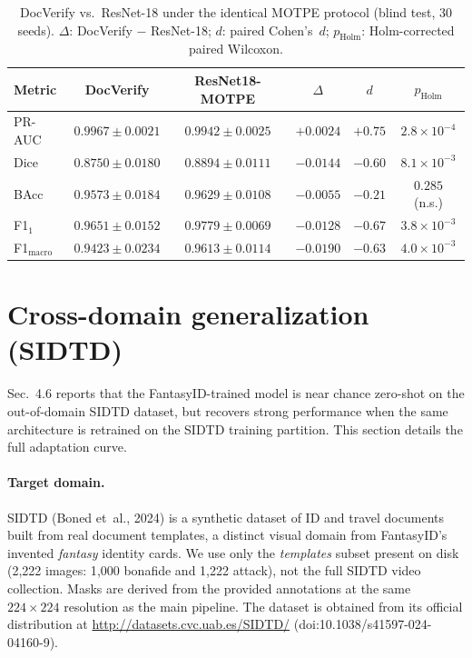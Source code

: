 \documentclass[11pt]{article}
\begin{document}
\begin{table}[h]
  \centering
  \caption{DocVerify vs.\ ResNet-18 under the identical MOTPE protocol
           (blind test, 30 seeds). $\Delta$: DocVerify $-$ ResNet-18;
           $d$: paired Cohen's~$d$; $p_{\text{Holm}}$: Holm-corrected paired
           Wilcoxon.}
  \label{tab:resnet}
  \begin{tabular}{lccccc}
    \toprule
    Metric & DocVerify & ResNet18-MOTPE & $\Delta$ & $d$ & $p_{\text{Holm}}$ \\
    \midrule
    PR-AUC    & $0.9967\pm0.0021$ & $0.9942\pm0.0025$ & $+0.0024$ & $+0.75$ & $2.8\times10^{-4}$ \\
    Dice      & $0.8750\pm0.0180$ & $0.8894\pm0.0111$ & $-0.0144$ & $-0.60$ & $8.1\times10^{-3}$ \\
    BAcc      & $0.9573\pm0.0184$ & $0.9629\pm0.0108$ & $-0.0055$ & $-0.21$ & $0.285$ (n.s.) \\
    F1$_1$    & $0.9651\pm0.0152$ & $0.9779\pm0.0069$ & $-0.0128$ & $-0.67$ & $3.8\times10^{-3}$ \\
    F1$_{\text{macro}}$ & $0.9423\pm0.0234$ & $0.9613\pm0.0114$ & $-0.0190$ & $-0.63$ & $4.0\times10^{-3}$ \\
    \bottomrule
  \end{tabular}
\end{table}

\section{Cross-domain generalization (SIDTD)}
\label{sec:sidtd}

Sec.~4.6 reports that the FantasyID-trained model is near chance zero-shot on
the out-of-domain SIDTD dataset, but recovers strong performance when the same
architecture is retrained on the SIDTD training partition. This section details
the full adaptation curve.

\paragraph{Target domain.} SIDTD (Boned et~al., 2024) is a synthetic dataset of ID
and travel documents built from real document templates, a distinct visual domain
from FantasyID's invented \emph{fantasy} identity cards. We use only the
\emph{templates} subset present on disk (2{,}222 images: 1{,}000 bonafide and
1{,}222 attack), not the full SIDTD video collection. Masks are derived from the
provided annotations at the same $224\times224$ resolution as the main pipeline.
The dataset is obtained from its official distribution at
\url{http://datasets.cvc.uab.es/SIDTD/} (doi:10.1038/s41597-024-04160-9).
\end{document}
